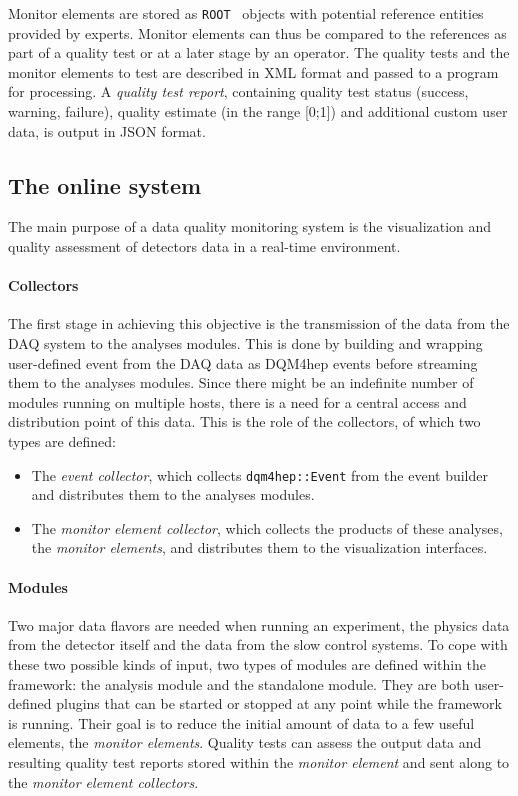 \documentclass{webofc}
\begin{document}
Monitor elements are stored as \texttt{ROOT}~\cite{ROOT} objects with potential reference entities provided by experts.
Monitor elements can thus be compared to the references as part of a quality test or at a later stage by an operator.
The quality tests and the monitor elements to test are described in XML format and passed to a program for processing.
A \textit{quality test report}, containing quality test status (success, warning, failure), quality estimate (in the range [0;1]) and additional custom user data, is output in JSON format.

\subsection{The online system}
\label{subsec:online}
The main purpose of a data quality monitoring system is the visualization and quality assessment of detectors data in a real-time environment.

\paragraph{Collectors}\label{par:Collectors}
The first stage in achieving this objective is the transmission of the data from the DAQ system to the analyses modules.
This is done by building and wrapping user-defined event from the DAQ data as DQM4hep events before streaming them to the analyses modules.
Since there might be an indefinite number of modules running on multiple hosts, there is a need for a central access and distribution point of this data. This is the role of the collectors, of which two types are defined:

\begin{itemize}
  \item The \textit{event collector}, which collects \texttt{dqm4hep::Event} from the event builder and distributes them to the analyses modules.
  \item The \textit{monitor element collector}, which collects the products of these analyses, the \textit{monitor elements}, and distributes them to the visualization interfaces.
\end{itemize}

\paragraph{Modules}\label{par:Modules}
Two major data flavors are needed when running an experiment, the physics data from the detector itself and the data from the slow control systems.
To cope with these two possible kinds of input, two types of modules are defined within the framework: the analysis module and the standalone module.
They are both user-defined plugins that can be started or stopped at any point while the framework is running.
Their goal is to reduce the initial amount of data to a few useful elements, the \textit{monitor elements}.
Quality tests can assess the output data and resulting quality test reports stored within the \textit{monitor element} and sent along to the \textit{monitor element collectors}.
\end{document}
